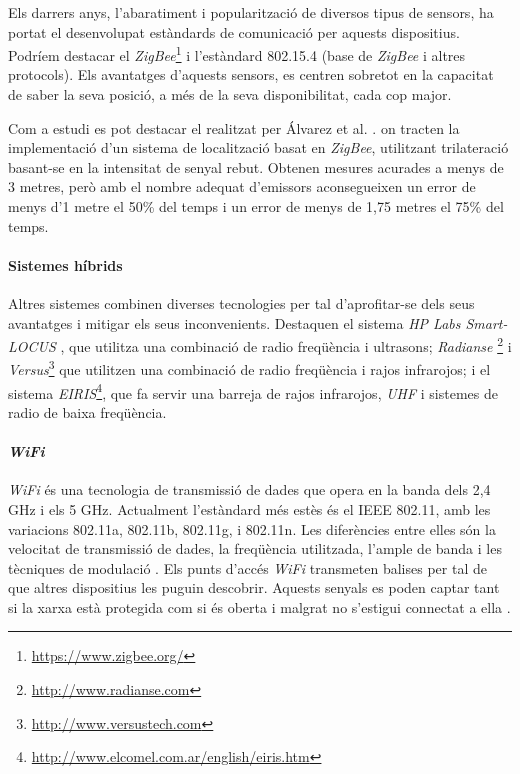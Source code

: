 Els darrers anys, l'abaratiment i popularització de diversos tipus de sensors, ha portat el desenvolupat estàndards de comunicació per aquests dispositius. Podríem destacar el \textit{ZigBee}\footnote{\url{https://www.zigbee.org/}} i l'estàndard 802.15.4 (base de \textit{ZigBee} i altres protocols). Els avantatges d'aquests sensors, es centren sobretot en la capacitat de saber la seva posició, a més de la seva disponibilitat, cada cop major.

Com a estudi es pot destacar el realitzat per Álvarez et al. \cite{alvarez}. on tracten la implementació d’un sistema de localització basat en \textit{ZigBee}, utilitzant trilateració basant-se en la intensitat de senyal rebut. Obtenen mesures acurades a menys de 3 metres, però amb el nombre adequat d'emissors aconsegueixen un error de menys d’1 metre el 50\% del temps i un error de menys de 1,75 metres el 75\% del temps.

\paragraph{Sistemes híbrids}

Altres sistemes combinen diverses tecnologies per tal d'aprofitar-se dels seus avantatges i mitigar els seus inconvenients. Destaquen el sistema \textit{HP Labs Smart-LOCUS} \cite{oconnor}, que utilitza una combinació de radio freqüència i ultrasons; \textit{Radianse} \footnote{\url{http://www.radianse.com}} i \textit{Versus}\footnote{\url{http://www.versustech.com}} que utilitzen una combinació de radio freqüència i rajos infrarojos; i el sistema \textit{EIRIS}\footnote{\url{http://www.elcomel.com.ar/english/eiris.htm}}, que fa servir una barreja de rajos infrarojos, \textit{UHF} i sistemes de radio de baixa freqüència.

\paragraph{\textit{WiFi}}

\textit{WiFi} és una tecnologia de transmissió de dades que opera en la banda dels 2,4 GHz i els 5 GHz. Actualment l'estàndard més estès és el IEEE 802.11, amb les variacions 802.11a, 802.11b, 802.11g, i 802.11n. Les diferències entre elles són la velocitat de transmissió de dades, la freqüència utilitzada, l’ample de banda i les tècniques de modulació \cite{chan}. Els punts d’accés \textit{WiFi} transmeten balises per tal de que altres dispositius les puguin descobrir. Aquests senyals es poden captar tant si la xarxa està protegida com si és oberta i malgrat no s’estigui connectat a ella \cite{vilaseca}.

